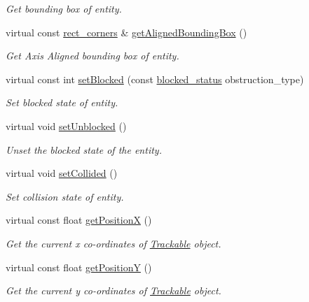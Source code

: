 \begin{DoxyCompactItemize}
\begin{DoxyCompactList}\small\item\em Get bounding box of entity. \end{DoxyCompactList}\item 
virtual const \hyperlink{structrect__corners}{rect\-\_\-corners} \& \hyperlink{classTurret_ad17a5c236d681627bbea6bb99b2374b0}{get\-Aligned\-Bounding\-Box} ()
\begin{DoxyCompactList}\small\item\em Get Axis Aligned bounding box of entity. \end{DoxyCompactList}\item 
virtual const int \hyperlink{classTurret_a047fe39c0367cc0896c43ac6fadfd2b6}{set\-Blocked} (const \hyperlink{Structures_8h_a6fef29d9424addfa69bdd2a379424896}{blocked\-\_\-status} obstruction\-\_\-type)
\begin{DoxyCompactList}\small\item\em Set blocked state of entity. \end{DoxyCompactList}\item 
virtual void \hyperlink{classTurret_a1cafbfb89d052d03c8e7db8b0668a75d}{set\-Unblocked} ()
\begin{DoxyCompactList}\small\item\em Unset the blocked state of the entity. \end{DoxyCompactList}\item 
virtual void \hyperlink{classTurret_a2f558a151cc9c7e7f2158c71f71261cb}{set\-Collided} ()
\begin{DoxyCompactList}\small\item\em Set collision state of entity. \end{DoxyCompactList}\item 
virtual const float \hyperlink{classTurret_a3e713aaf3b26c4dfc49893b4a7796dfd}{get\-Position\-X} ()
\begin{DoxyCompactList}\small\item\em Get the current x co-\/ordinates of \hyperlink{classTrackable}{Trackable} object. \end{DoxyCompactList}\item 
virtual const float \hyperlink{classTurret_a9d331d408eec415f38ea8249fb0ad3ef}{get\-Position\-Y} ()
\begin{DoxyCompactList}\small\item\em Get the current y co-\/ordinates of \hyperlink{classTrackable}{Trackable} object. \end{DoxyCompactList}\item 

\end{DoxyCompactItemize}
